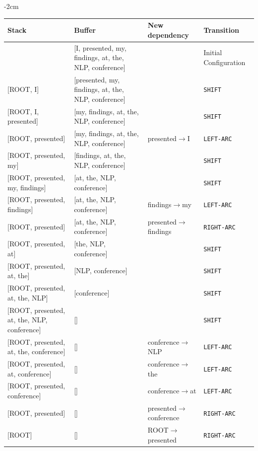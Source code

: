 \begin{parts}
    \begin{adjustwidth}{-2cm}{}
    \begin{tabular}{ l | l | l | l}
    Stack & Buffer & New dependency & Transition \\ \hline
    [ROOT] & [I, presented, my, findings, at, the, NLP, conference] &  & Initial Configuration \\
    $[$ROOT, I] & [presented, my, findings, at, the, NLP, conference] &  &  \texttt{SHIFT}  \\
    $[$ROOT, I, presented] & [my, findings, at, the, NLP, conference] &  &  \texttt{SHIFT}  \\
    $[$ROOT, presented] & [my, findings, at, the, NLP, conference] & presented$\to$I &  \texttt{LEFT-ARC}  \\
    {\color{red}$[$ROOT, presented, my]} & {\color{red}[findings, at, the, NLP, conference]} &  &  {\color{red}\texttt{SHIFT}}  \\
    {\color{red}$[$ROOT, presented, my, findings]} & {\color{red}[at, the, NLP, conference]} &  &  {\color{red}\texttt{SHIFT}}  \\
    {\color{red}$[$ROOT, presented, findings]} & {\color{red}[at, the, NLP, conference]} & {\color{red}findings$\to$my} &  {\color{red}\texttt{LEFT-ARC}}  \\
    {\color{red}$[$ROOT, presented]} & {\color{red}[at, the, NLP, conference]} & {\color{red}presented$\to$findings} &  {\color{red}\texttt{RIGHT-ARC}}  \\
    {\color{red}$[$ROOT, presented, at]} & {\color{red}[the, NLP, conference]} &  &  {\color{red}\texttt{SHIFT}}  \\
    {\color{red}$[$ROOT, presented, at, the]} & {\color{red}[NLP, conference]} &  &  {\color{red}\texttt{SHIFT}}  \\
    {\color{red}$[$ROOT, presented, at, the, NLP]} & {\color{red}[conference]} &  &  {\color{red}\texttt{SHIFT}}  \\
    {\color{red}$[$ROOT, presented, at, the, NLP, conference]} & {\color{red}[]} &  &  {\color{red}\texttt{SHIFT}}  \\
    {\color{red}$[$ROOT, presented, at, the, conference]} & {\color{red}[]} & {\color{red}conference$\to$NLP} &  {\color{red}\texttt{LEFT-ARC}}  \\
    {\color{red}$[$ROOT, presented, at, conference]} & {\color{red}[]} & {\color{red}conference$\to$the} &  {\color{red}\texttt{LEFT-ARC}}  \\
    {\color{red}$[$ROOT, presented, conference]} & {\color{red}[]} & {\color{red}conference$\to$at} &  {\color{red}\texttt{LEFT-ARC}}  \\
    {\color{red}$[$ROOT, presented]} & {\color{red}[]} & {\color{red}presented$\to$conference} &  {\color{red}\texttt{RIGHT-ARC}}  \\
    {\color{red}$[$ROOT]} & {\color{red}[]} & {\color{red}ROOT$\to$presented} &  {\color{red}\texttt{RIGHT-ARC}}  \\
    \end{tabular}\newline
    \end{adjustwidth}
    

\end{parts}
